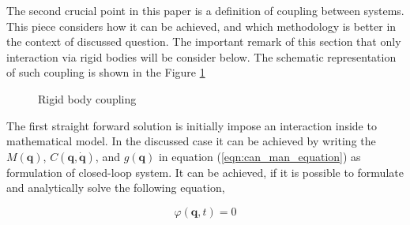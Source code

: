 The second crucial point in this paper is a definition of coupling between 
systems. This piece considers how it can be achieved, and which methodology 
is better in the context of discussed question. The important remark of this 
section that only interaction via rigid bodies will be consider below. 
The schematic representation of such coupling is shown in the Figure 
\ref{fig:rigid_coupling}

\begin{figure}[H]
    \centering
    \caption{Rigid body coupling}
    \label{fig:rigid_coupling}
\end{figure}

The first straight forward solution is initially impose an interaction inside 
to mathematical model. In the discussed case it can be achieved by writing 
the $M(\mathbf{q})$, $C(\mathbf{q}, \dot{\mathbf{q}})$, and $g(\mathbf{q})$ 
in equation (\ref{eqn:can_man_equation}) as formulation of closed-loop system. 
It can be achieved, if it is possible to formulate and analytically solve the 
following equation,

\begin{equation}
    \label{eqn:holonom_const}
    \varphi (\mathbf{q}, t) = 0
\end{equation}


